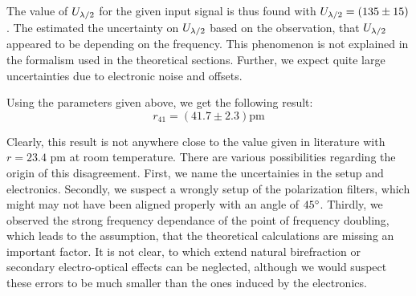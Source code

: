 The value of $U_{\lambda/2}$ for the given input signal is thus 
found with $U_{\lambda/2} = (135  \pm 15)$. 
The estimated the uncertainty on $U_{\lambda/2}$ based on the 
observation, that $U_{\lambda/2}$ appeared to be 
depending on the frequency. This phenomenon is not 
explained in the formalism used in the theoretical sections. 
Further, we expect quite large uncertainties due to 
electronic noise and offsets. 

Using the parameters given above, we get the following result: 
\begin{equation*}
r_{41} = \left (41.7 \pm 2.3 \right )  \mathrm{pm}
\end{equation*}

Clearly, this result is not anywhere close to the value given in 
literature with $r = 23.4$ pm at room temperature. There are 
various possibilities regarding the origin of this disagreement. 
First, we name the uncertainies in the setup and electronics. 
Secondly, we suspect a wrongly setup of the polarization filters, 
which might may not have been aligned properly with an 
angle of $45^\circ$. Thirdly, we observed the strong frequency dependance of 
the point of frequency doubling, which leads to the assumption, that 
the theoretical calculations are missing an important factor. 
It is not clear, to which extend natural birefraction or 
secondary electro-optical effects can be neglected, although 
we would suspect these errors to be much smaller than the ones 
induced by the electronics. 



